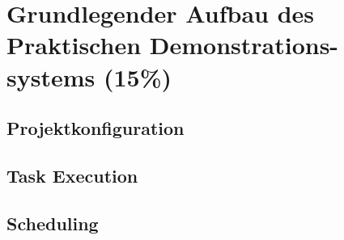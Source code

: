 \chapter{Grundlegender Aufbau des Praktischen Demonstrations-systems (15\%)}
\section{Projektkonfiguration}
\section{Task Execution}
\section{Scheduling}
